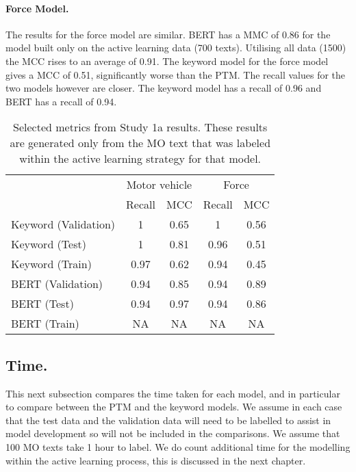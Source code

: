\paragraph{Force Model.} The results for the force model are similar. BERT has a MMC of 0.86 for the model built only on the active learning data (700 texts). Utilising all data (1500) the MCC rises to an average of 0.91. The keyword model for the force model gives a MCC of 0.51, significantly worse than the PTM. The recall values for the  two models however are closer. The keyword model has a recall of 0.96 and BERT has a recall of 0.94.

\begin{table}[]
\begin{tabular}{@{}lcccc@{}}
\toprule
                         & \multicolumn{2}{c}{Motor vehicle} & \multicolumn{2}{c}{Force} \\ 
                         & Recall           & MCC            & Recall       & MCC        \\\midrule
Keyword (Validation)     & 1                & 0.65           & 1            & 0.56       \\
Keyword (Test)           & 1                & 0.81           & 0.96         & 0.51       \\
Keyword (Train)          & 0.97             & 0.62           & 0.94         & 0.45       \\\midrule
BERT (Validation)        & 0.94                & 0.85           & 0.94            & 0.89          \\
BERT (Test)              & 0.94                & 0.97           &0.94           & 0.86         \\
BERT (Train)             & NA               & NA             & NA           & NA         \\ \bottomrule
\end{tabular}
\caption[Model metrics. PF1 data. Force used and motor vehicle model.]{\label{tab:results_study_1} Selected metrics from Study 1a results. These results are generated only from the MO text that was labeled within the active learning strategy for that model.}
\end{table}


\subsection{Time.} This next subsection compares the time taken for each model, and in particular to compare between the PTM and the keyword models. We assume in each case that the test data and the validation data will need to be labelled to assist in model development so will not be included in the comparisons. We assume that 100 MO texts take 1 hour to label. We do count additional time for the modelling within the active learning process, this is discussed in the next chapter. 

